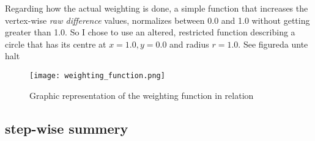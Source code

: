 Regarding how the actual weighting is done, a simple function that increases the vertex-wise \textit{raw difference} values, normalizes between 0.0 and 1.0 without getting greater than 1.0. So I chose to use an altered, restricted function describing a circle that has its centre at $x = 1.0, y = 0.0$ and radius $r = 1.0$. See figure{da unte halt}

\begin{figure}[htb]
  \centering
  \texttt{[image: weighting\_function.png]}\\ %
  \caption{Graphic representation of the weighting function in relation}\label{fig:weighting_function}
\end{figure}

		\subsection{step-wise summery}
		\label{sec:ste_wise_summery}
